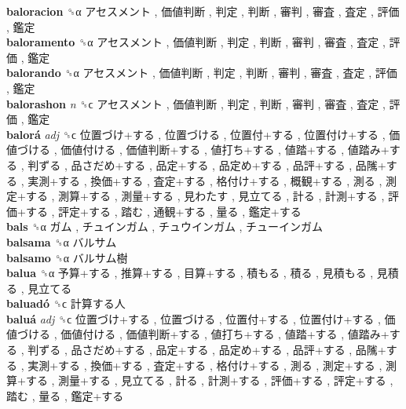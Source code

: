 \textbf{baloracion} ␝α   アセスメント ,  価値判断 ,  判定 ,  判断 ,  審判 ,  審査 ,  査定 ,  評価 ,  鑑定   \\
\textbf{baloramento} ␝α   アセスメント ,  価値判断 ,  判定 ,  判断 ,  審判 ,  審査 ,  査定 ,  評価 ,  鑑定   \\
\textbf{balorando} ␝α   アセスメント ,  価値判断 ,  判定 ,  判断 ,  審判 ,  審査 ,  査定 ,  評価 ,  鑑定   \\
\textbf{balorashon} \emph{n}  ␝ϲ   アセスメント ,  価値判断 ,  判定 ,  判断 ,  審判 ,  審査 ,  査定 ,  評価 ,  鑑定   \\
\textbf{balorá} \emph{adj}  ␝ϲ   位置づけ+する ,  位置づける ,  位置付+する ,  位置付け+する ,  価値づける ,  価値付ける ,  価値判断+する ,  値打ち+する ,  値踏+する ,  値踏み+する ,  判ずる ,  品さだめ+する ,  品定+する ,  品定め+する ,  品評+する ,  品隲+する ,  実測+する ,  換価+する ,  査定+する ,  格付け+する ,  概観+する ,  測る ,  測定+する ,  測算+する ,  測量+する ,  見わたす ,  見立てる ,  計る ,  計測+する ,  評価+する ,  評定+する ,  踏む ,  通観+する ,  量る ,  鑑定+する   \\
\textbf{bals} ␝α   ガム ,  チュインガム ,  チュウインガム ,  チューインガム   \\
\textbf{balsama} ␝α   バルサム   \\
\textbf{balsamo} ␝α   バルサム樹   \\
\textbf{balua} ␝α   予算+する ,  推算+する ,  目算+する ,  積もる ,  積る ,  見積もる ,  見積る ,  見立てる   \\
\textbf{baluadó} ␝ϲ   計算する人   \\
\textbf{baluá} \emph{adj}  ␝ϲ   位置づけ+する ,  位置づける ,  位置付+する ,  位置付け+する ,  価値づける ,  価値付ける ,  価値判断+する ,  値打ち+する ,  値踏+する ,  値踏み+する ,  判ずる ,  品さだめ+する ,  品定+する ,  品定め+する ,  品評+する ,  品隲+する ,  実測+する ,  換価+する ,  査定+する ,  格付け+する ,  測る ,  測定+する ,  測算+する ,  測量+する ,  見立てる ,  計る ,  計測+する ,  評価+する ,  評定+する ,  踏む ,  量る ,  鑑定+する   \\
